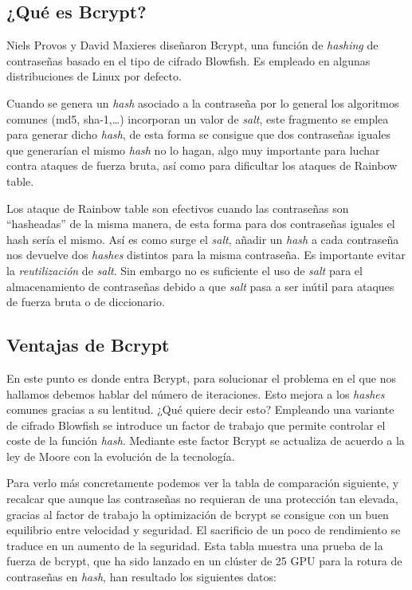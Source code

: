 \subsection{¿Qué es Bcrypt?}
Niels Provos y David Maxieres diseñaron Bcrypt, una función de \textit{hashing} de contraseñas basado en el tipo de cifrado Blowfish. Es empleado en algunas distribuciones de Linux por defecto. 


Cuando se genera un \textit{hash} asociado a la contraseña por lo general los algoritmos comunes (md5, sha-1,…) incorporan un valor de \textit{salt}, este fragmento se emplea para generar dicho \textit{hash}, de esta forma se consigue que dos contraseñas iguales que generarían el mismo \textit{hash} no lo hagan, algo muy importante para luchar contra ataques de fuerza bruta, así como para dificultar los ataques de Rainbow table.


Los ataque de Rainbow table son efectivos cuando las contraseñas son ``hasheadas'' de la misma manera, de esta forma para dos contraseñas iguales el hash sería el mismo. Así es como surge el \textit{salt}, añadir un \textit{hash} a cada contraseña nos devuelve dos \textit{hashes} distintos para la misma contraseña. Es importante evitar la \textit{reutilización} de \textit{salt}. Sin embargo no es suficiente el uso de \textit{salt} para el almacenamiento de contraseñas debido a que \textit{salt} pasa a ser inútil para ataques de fuerza bruta o de diccionario.


\subsection{Ventajas de Bcrypt}
En este punto es donde entra Bcrypt, para solucionar el problema en el que nos hallamos debemos hablar del número de iteraciones. Esto mejora a los \textit{hashes} comunes gracias a su lentitud. ¿Qué quiere decir esto? Empleando una variante de cifrado Blowfish se introduce un factor de trabajo que permite controlar el coste de la función \textit{hash}. Mediante este factor Bcrypt se actualiza de acuerdo a la ley de Moore con la evolución de la tecnología.


Para verlo más concretamente podemos ver la tabla de comparación siguiente, y recalcar que aunque las contraseñas no requieran de una protección tan elevada, gracias al factor de trabajo la optimización de bcrypt se consigue con un buen equilibrio entre velocidad y seguridad. El sacrificio de un poco de rendimiento se traduce en un aumento de la seguridad. 
Esta tabla muestra una prueba de la fuerza de bcrypt, que ha sido lanzado en un clúster de 25 GPU para la rotura de contraseñas en \textit{hash}, han resultado los siguientes datos:


